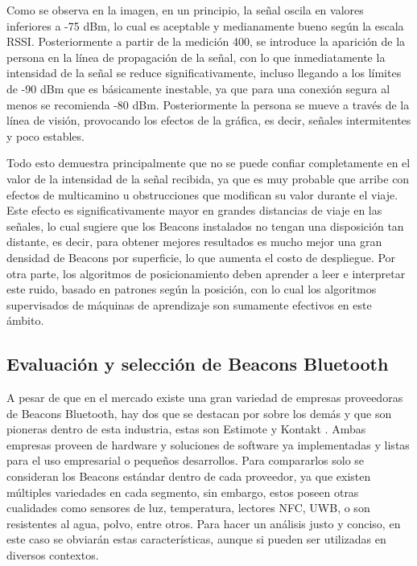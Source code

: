 Como se observa en la imagen, en un principio, la señal oscila en valores inferiores a -75 dBm, lo cual es aceptable y medianamente bueno según la escala RSSI. Posteriormente a partir de la medición 400, se introduce la aparición de la persona en la línea de propagación de la señal, con lo que inmediatamente la intensidad de la señal se reduce significativamente, incluso llegando a los límites de -90 dBm que es básicamente inestable, ya que para una conexión segura al menos se recomienda -80 dBm. Posteriormente la persona se mueve a través de la línea de visión, provocando los efectos de la gráfica, es decir, señales intermitentes y poco estables.

Todo esto demuestra principalmente que no se puede confiar completamente en el valor de la intensidad de la señal recibida, ya que es muy probable que arribe con efectos de multicamino u obstrucciones que modifican su valor durante el viaje. Este efecto es significativamente mayor en grandes distancias de viaje en las señales, lo cual sugiere que los Beacons instalados no tengan una disposición tan distante, es decir, para obtener mejores resultados es mucho mejor una gran densidad de Beacons por superficie, lo que aumenta el costo de despliegue. Por otra parte, los algoritmos de posicionamiento deben aprender a leer e interpretar este ruido, basado en patrones según la posición, con lo cual los algoritmos supervisados de máquinas de aprendizaje son sumamente efectivos en este ámbito.


\subsection{Evaluación y selección de Beacons Bluetooth}
\label{sec:seleccion}

A pesar de que en el mercado existe una gran variedad de empresas proveedoras de Beacons Bluetooth, hay dos que se destacan por sobre los demás y que son pioneras dentro de esta industria, estas son Estimote \citep{estimote} y Kontakt \citep{kontaktio}. Ambas empresas proveen de hardware y soluciones de software ya implementadas y listas para el uso empresarial o pequeños desarrollos. Para compararlos solo se consideran los Beacons estándar dentro de cada proveedor, ya que existen múltiples variedades en cada segmento, sin embargo, estos poseen otras cualidades como sensores de luz, temperatura, lectores NFC, UWB, o son resistentes al agua, polvo, entre otros. Para hacer un análisis justo y conciso, en este caso se obviarán estas características, aunque si pueden ser utilizadas en diversos contextos. 

